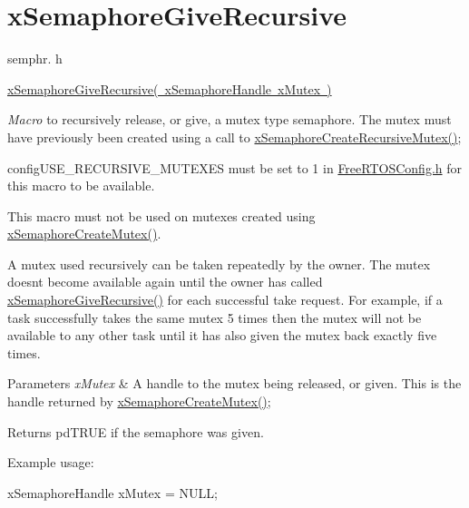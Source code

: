 \hypertarget{group__x_semaphore_give_recursive}{}\section{x\+Semaphore\+Give\+Recursive}
\label{group__x_semaphore_give_recursive}
semphr. h 
\begin{DoxyPre}\mbox{\hyperlink{semphr_8h_a398d66b17856c22dd49d39aaac42f105}{xSemaphoreGiveRecursive( xSemaphoreHandle xMutex )}}\end{DoxyPre}


{\itshape Macro} to recursively release, or \textquotesingle{}give\textquotesingle{}, a mutex type semaphore. The mutex must have previously been created using a call to \mbox{\hyperlink{semphr_8h_a1bbc843be5a41ea83d2693b2189fc0f8}{x\+Semaphore\+Create\+Recursive\+Mutex()}};

config\+U\+S\+E\+\_\+\+R\+E\+C\+U\+R\+S\+I\+V\+E\+\_\+\+M\+U\+T\+E\+X\+ES must be set to 1 in \mbox{\hyperlink{_free_r_t_o_s_config_8h}{Free\+R\+T\+O\+S\+Config.\+h}} for this macro to be available.

This macro must not be used on mutexes created using \mbox{\hyperlink{semphr_8h_aa6a00aa9b91a9e5b3ebe4ae1c3f115c6}{x\+Semaphore\+Create\+Mutex()}}.

A mutex used recursively can be \textquotesingle{}taken\textquotesingle{} repeatedly by the owner. The mutex doesn\textquotesingle{}t become available again until the owner has called \mbox{\hyperlink{semphr_8h_a398d66b17856c22dd49d39aaac42f105}{x\+Semaphore\+Give\+Recursive()}} for each successful \textquotesingle{}take\textquotesingle{} request. For example, if a task successfully \textquotesingle{}takes\textquotesingle{} the same mutex 5 times then the mutex will not be available to any other task until it has also \textquotesingle{}given\textquotesingle{} the mutex back exactly five times.


\begin{DoxyParams}{Parameters}
{\em x\+Mutex} & A handle to the mutex being released, or \textquotesingle{}given\textquotesingle{}. This is the handle returned by \mbox{\hyperlink{semphr_8h_aa6a00aa9b91a9e5b3ebe4ae1c3f115c6}{x\+Semaphore\+Create\+Mutex()}};\\
\hline
\end{DoxyParams}
\begin{DoxyReturn}{Returns}
pd\+T\+R\+UE if the semaphore was given.
\end{DoxyReturn}
Example usage\+: 
\begin{DoxyPre}
xSemaphoreHandle xMutex = NULL;\end{DoxyPre}



